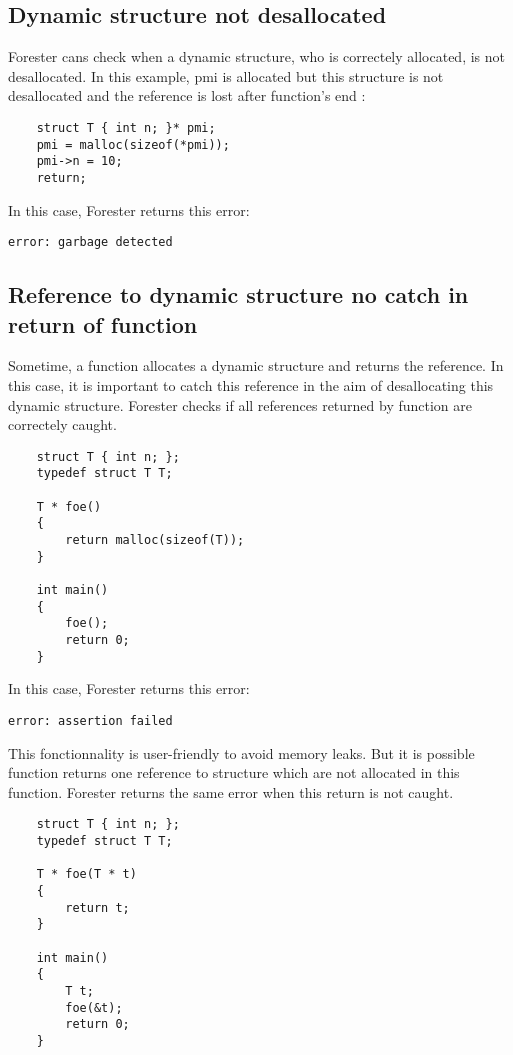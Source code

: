 	\subsection{Dynamic structure not desallocated}
	
Forester cans check when a dynamic structure, who is correctely allocated, is not desallocated. In this example, pmi is allocated but this structure is not desallocated and the reference is lost after function's end :

\begin{lstlisting}
	struct T { int n; }* pmi;
	pmi = malloc(sizeof(*pmi));
	pmi->n = 10;
	return;
\end{lstlisting}
\bigskip

In this case, Forester returns this error:

\begin{lstlisting}
error: garbage detected
\end{lstlisting}
\bigskip

	\subsection{Reference to dynamic structure no catch in return of function}
	
Sometime, a function allocates a dynamic structure and returns the reference. In this case, it is important to catch this reference in the aim of desallocating this dynamic structure. Forester checks if all references returned by function are correctely caught.

\begin{lstlisting}
	struct T { int n; };
	typedef struct T T;

	T * foe()
	{
		return malloc(sizeof(T));
	}

	int main()
	{
		foe();
		return 0;
	}
\end{lstlisting}
\bigskip

In this case, Forester returns this error:

\begin{lstlisting}
error: assertion failed
\end{lstlisting}
\bigskip

This fonctionnality is user-friendly to avoid memory leaks. But it is possible function returns one reference to structure which are not allocated in this function. Forester returns the same error when this return is not caught.

\begin{lstlisting}
	struct T { int n; };
	typedef struct T T;

	T * foe(T * t)
	{
		return t;
	}

	int main()
	{
		T t;
		foe(&t);
		return 0;
	}
\end{lstlisting}
\bigskip